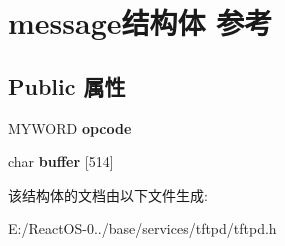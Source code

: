 \hypertarget{structmessage}{}\section{message结构体 参考}
\label{structmessage}
\subsection*{Public 属性}
\begin{DoxyCompactItemize}
\item 
\mbox{\label{structmessage_a6f72df877202344c98d76ecb66eff5de}} 
M\+Y\+W\+O\+RD {\bfseries opcode}
\item 
\mbox{\label{structmessage_a70881d2e745829e6c06bd628de910754}} 
char {\bfseries buffer} \mbox{[}514\mbox{]}
\end{DoxyCompactItemize}


该结构体的文档由以下文件生成\+:\begin{DoxyCompactItemize}
\item 
E\+:/\+React\+O\+S-\/0../base/services/tftpd/tftpd.\+h\end{DoxyCompactItemize}
